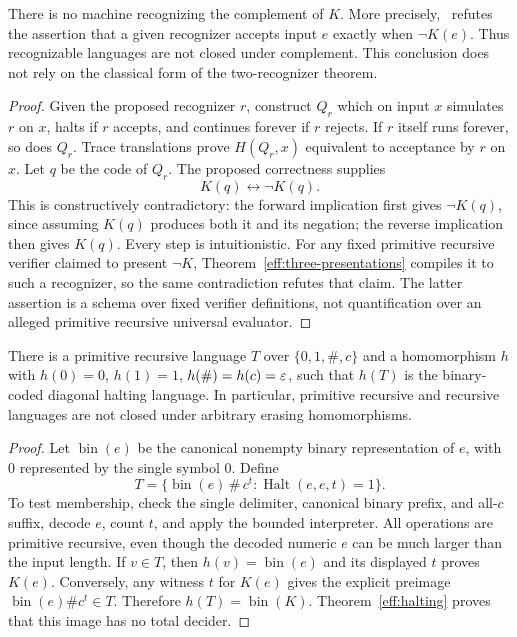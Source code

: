 \begin{theorem}
\label{eff:complement}
There is no machine recognizing the complement of $K$.  More precisely,
\ipra\ refutes the assertion that a given recognizer accepts input $e$
exactly when $\neg K(e)$.  Thus recognizable languages are not closed under
complement.  This conclusion does not rely on the classical form of the
two-recognizer theorem.
\end{theorem}
\begin{proof}
Given the proposed recognizer $r$, construct $Q_r$ which on input $x$
simulates $r$ on $x$, halts if $r$ accepts, and continues forever if $r$
rejects.  If $r$ itself runs forever, so does $Q_r$.  Trace translations
prove $H(Q_r,x)$ equivalent to acceptance by $r$ on $x$.
Let $q$ be the code of $Q_r$.  The proposed correctness supplies
\[
 K(q)\longleftrightarrow\neg K(q).
\]
This is constructively contradictory: the forward implication first gives
$\neg K(q)$, since assuming $K(q)$ produces both it and its negation;
the reverse implication then gives $K(q)$.  Every step is intuitionistic.
For any fixed primitive recursive verifier claimed to present $\neg K$,
Theorem~\ref{eff:three-presentations} compiles it to such a recognizer, so
the same contradiction refutes that claim.  The latter assertion is a
schema over fixed verifier definitions, not quantification over an alleged
primitive recursive universal evaluator.
\end{proof}

\begin{theorem}\label{eff:erasing}
There is a primitive recursive language $T$ over
$\{0,1,\#,c\}$ and a homomorphism $h$ with
$h(0)=0$, $h(1)=1$, $h(\#)=h(c)=\varepsilon$, such that $h(T)$ is the binary-coded
diagonal halting language.  In particular, primitive recursive and recursive
languages are not closed under arbitrary erasing homomorphisms.
\end{theorem}
\begin{proof}
Let $\operatorname{bin}(e)$ be the canonical nonempty binary representation
of $e$, with $0$ represented by the single symbol $0$.  Define
\[
 T=\{\operatorname{bin}(e)\,\#\,c^t:
               \operatorname{Halt}(e,e,t)=1\}.
\]
To test membership, check the single delimiter, canonical binary prefix,
and all-$c$ suffix, decode $e$, count $t$, and apply the bounded interpreter.
All operations are primitive recursive, even though the decoded numeric
$e$ can be much larger than the input length.  If $v\in T$, then
$h(v)=\operatorname{bin}(e)$ and its displayed $t$ proves $K(e)$.
Conversely, any witness $t$ for $K(e)$ gives the explicit preimage
$\operatorname{bin}(e)\#c^t\in T$.  Therefore $h(T)=\operatorname{bin}(K)$.
Theorem~\ref{eff:halting} proves that this image has no total decider.
\end{proof}

